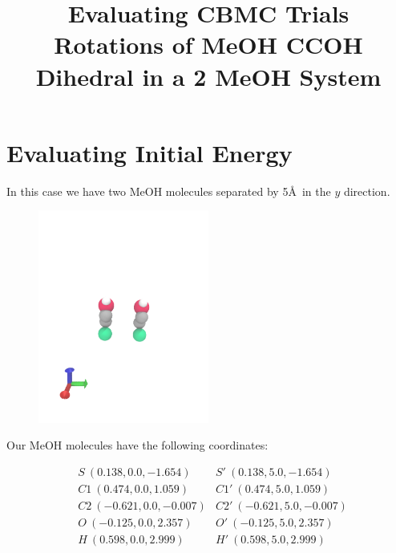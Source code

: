 \documentclass{article}\usepackage[]{graphicx}\usepackage[]{color}
\begin{document}
\title{Evaluating CBMC Trials \\ \large Rotations of MeOH CCOH Dihedral in a 2 MeOH System}
\maketitle

\section{Evaluating Initial Energy}

In this case we have two MeOH molecules separated by 5\AA\ in the $y$ direction.

\begin{figure}[H]
  \center
  \includegraphics[trim=0 0 0 300,clip,width=0.5\textwidth]{two_meoh}
\end{figure}

Our MeOH molecules have the following coordinates:

\begin{align*}
  &S\ (0.138,0.0,-1.654)   &S'\ (0.138,5.0,-1.654)\\
  &C1\ (0.474,0.0,1.059)   &C1'\ (0.474,5.0,1.059)\\
  &C2\ (-0.621,0.0,-0.007) &C2'\ (-0.621,5.0,-0.007)\\
  &O\ (-0.125,0.0,2.357)   &O'\ (-0.125,5.0,2.357)\\
  &H\ (0.598,0.0,2.999)    &H'\ (0.598,5.0,2.999)\\
\end{align*}
\end{document}
